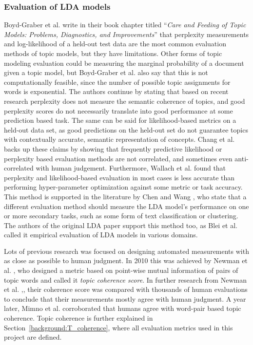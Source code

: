         \subsubsection{Evaluation of LDA models}
           Boyd-Graber et al. \cite{boyd2014care} write in their book chapter titled ``\textit{Care and Feeding of Topic Models: Problems, Diagnostics, and Improvements}'' that perplexity measurements and log-likelihood of a held-out test data are the most common evaluation methods of topic models, but they have limitations. Other forms of topic modeling evaluation could be measuring the marginal probability of a document given a topic model, but Boyd-Graber et al. \cite{boyd2014care} also say that this is not computationally feasible, since the number of possible topic assignments for words is exponential. The authors continue by stating that based on recent research perplexity does not measure the semantic coherence of topics, and good perplexity scores do not necessarily translate into good performance at some prediction based task. The same can be said for likelihood-based metrics on a held-out data set, as good predictions on the held-out set do not guarantee topics with contextually accurate, semantic representation of concepts. Chang et al. \cite{chang2009reading} backs up these claims by showing that frequently predictive likelihood or perplexity based evaluation methods are not correlated, and sometimes even anti-correlated with human judgement. Furthermore, Wallach et al. \cite{wallach2009rethinking} found that perplexity and likelihood-based evaluation in most cases is less accurate than performing hyper-parameter optimization against some metric or task accuracy. This method is supported in the literature by Chen and Wang \cite{chen2011latent}, who state that a different evaluation method should measure the LDA model's performance on one or more secondary tasks, such as some form of text classification or clustering. The authors of the original LDA paper support this method too, as Blei et al. \cite{blei2003latent} called it empirical evaluation of LDA models in various domains. 
            
            Lots of previous research was focused on designing automated measurements with as close as possible to human judgment. In 2010 this was achieved by Newman et al. \cite{newman2010visualizing}, who designed a metric based on point-wise mutual information of pairs of topic words and called it \emph{topic coherence score}. In further research from Newman et al. \cite{newman2010visualizing},\cite{newman2010automatic}, their coherence score was compared with thousands of human evaluations to conclude that their measurements mostly agree with human judgment. A year later, Mimno et al. \cite{mimno2011optimizing} corroborated that humans agree with word-pair based topic coherence. Topic coherence is further explained in Section~\ref{background:T_coherence}, where all evaluation metrics used in this project are defined. 
        
